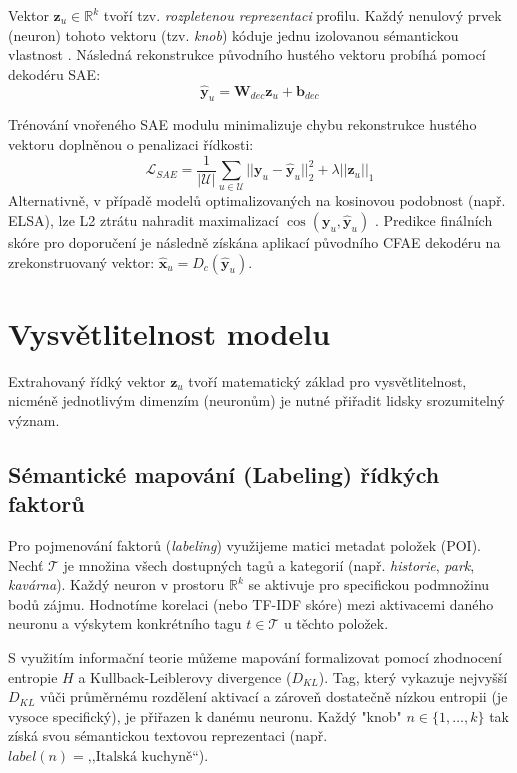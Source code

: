 Vektor $\mathbf{z}_u \in \mathbb{R}^k$ tvoří tzv. \textit{rozpletenou reprezentaci} profilu. Každý nenulový prvek (neuron) tohoto vektoru (tzv. \textit{knob}) kóduje jednu izolovanou sémantickou vlastnost \cite{Wang2021}. Následná rekonstrukce původního hustého vektoru probíhá pomocí dekodéru SAE:
\begin{equation}
    \mathbf{\hat{y}}_u = \mathbf{W}_{dec}\mathbf{z}_u + \mathbf{b}_{dec}
\end{equation}

Trénování vnořeného SAE modulu minimalizuje chybu rekonstrukce hustého vektoru doplněnou o penalizaci řídkosti:
\begin{equation}
    \mathcal{L}_{SAE} = \frac{1}{|\mathcal{U}|} \sum_{u \in \mathcal{U}} ||\mathbf{y}_u - \mathbf{\hat{y}}_u||_2^2 + \lambda ||\mathbf{z}_u||_1
\end{equation}
Alternativně, v případě modelů optimalizovaných na kosinovou podobnost (např. ELSA), lze L2 ztrátu nahradit maximalizací $\cos(\mathbf{y}_u, \mathbf{\hat{y}}_u)$ \cite{Spisak2024}. Predikce finálních skóre pro doporučení je následně získána aplikací původního CFAE dekodéru na zrekonstruovaný vektor: $\mathbf{\hat{x}}_u = D_c(\mathbf{\hat{y}}_u)$.

\section{Vysvětlitelnost modelu}
\label{sec:vysvetlitelnost}

Extrahovaný řídký vektor $\mathbf{z}_u$ tvoří matematický základ pro vysvětlitelnost, nicméně jednotlivým dimenzím (neuronům) je nutné přiřadit lidsky srozumitelný význam.

\subsection{Sémantické mapování (Labeling) řídkých faktorů}
Pro pojmenování faktorů (\textit{labeling}) využijeme matici metadat položek (POI). Nechť $\mathcal{T}$ je množina všech dostupných tagů a kategorií (např. \textit{historie}, \textit{park}, \textit{kavárna}). Každý neuron v prostoru $\mathbb{R}^k$ se aktivuje pro specifickou podmnožinu bodů zájmu. Hodnotíme korelaci (nebo TF-IDF skóre) mezi aktivacemi daného neuronu a výskytem konkrétního tagu $t \in \mathcal{T}$ u těchto položek.

S využitím informační teorie \cite{Wang2021} můžeme mapování formalizovat pomocí zhodnocení entropie $H$ a Kullback-Leiblerovy divergence ($D_{KL}$). Tag, který vykazuje nejvyšší $D_{KL}$ vůči průměrnému rozdělení aktivací a zároveň dostatečně nízkou entropii (je vysoce specifický), je přiřazen k danému neuronu. Každý "knob" $n \in \{1, \dots, k\}$ tak získá svou sémantickou textovou reprezentaci (např. $label(n) = \text{,,Italská kuchyně``}$).

